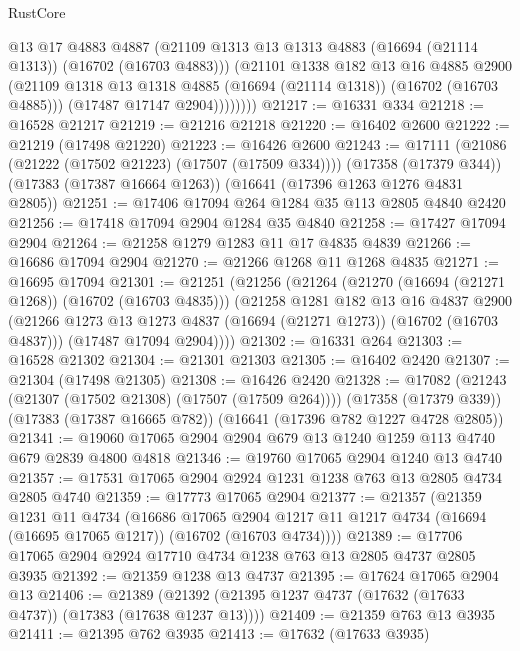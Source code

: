 \begin{lexlean}{RustCore}
\begin{coremodule}
                @13
                @17
                @4883
                @4887
                (@21109 @1313 @13 @1313 @4883 (@16694 (@21114 @1313)) (@16702 (@16703 @4883)))
                (@21101
                  @1338
                  @182
                  @13
                  @16
                  @4885
                  @2900
                  (@21109 @1318 @13 @1318 @4885 (@16694 (@21114 @1318)) (@16702 (@16703 @4885)))
                  (@17487 @17147 @2904))))))))
@21217 := @16331 @334
@21218 := @16528 @21217
@21219 := @21216 @21218
@21220 := @16402 @2600
@21222 := @21219 (@17498 @21220)
@21223 := @16426 @2600
@21243 := @17111
    (@21086 (@21222 (@17502 @21223) (@17507 (@17509 @334))))
    (@17358 (@17379 @344))
    (@17383 (@17387 @16664 @1263))
    (@16641 (@17396 @1263 @1276 @4831 @2805))
@21251 := @17406 @17094 @264 @1284 @35 @113 @2805 @4840 @2420
@21256 := @17418 @17094 @2904 @1284 @35 @4840
@21258 := @17427 @17094 @2904
@21264 := @21258 @1279 @1283 @11 @17 @4835 @4839
@21266 := @16686 @17094 @2904
@21270 := @21266 @1268 @11 @1268 @4835
@21271 := @16695 @17094
@21301 := @21251
    (@21256
      (@21264
        (@21270 (@16694 (@21271 @1268)) (@16702 (@16703 @4835)))
        (@21258
          @1281
          @182
          @13
          @16
          @4837
          @2900
          (@21266 @1273 @13 @1273 @4837 (@16694 (@21271 @1273)) (@16702 (@16703 @4837)))
          (@17487 @17094 @2904))))
@21302 := @16331 @264
@21303 := @16528 @21302
@21304 := @21301 @21303
@21305 := @16402 @2420
@21307 := @21304 (@17498 @21305)
@21308 := @16426 @2420
@21328 := @17082
    (@21243 (@21307 (@17502 @21308) (@17507 (@17509 @264))))
    (@17358 (@17379 @339))
    (@17383 (@17387 @16665 @782))
    (@16641 (@17396 @782 @1227 @4728 @2805))
@21341 := @19060 @17065 @2904 @2904 @679 @13 @1240 @1259 @113 @4740 @679 @2839 @4800 @4818
@21346 := @19760 @17065 @2904 @1240 @13 @4740
@21357 := @17531 @17065 @2904 @2924 @1231 @1238 @763 @13 @2805 @4734 @2805 @4740
@21359 := @17773 @17065 @2904
@21377 := @21357
    (@21359
      @1231
      @11
      @4734
      (@16686
        @17065
        @2904
        @1217
        @11
        @1217
        @4734
        (@16694 (@16695 @17065 @1217))
        (@16702 (@16703 @4734))))
@21389 := @17706 @17065 @2904 @2924 @17710 @4734 @1238 @763 @13 @2805 @4737 @2805 @3935
@21392 := @21359 @1238 @13 @4737
@21395 := @17624 @17065 @2904 @13
@21406 := @21389 (@21392 (@21395 @1237 @4737 (@17632 (@17633 @4737)) (@17383 (@17638 @1237 @13))))
@21409 := @21359 @763 @13 @3935
@21411 := @21395 @762 @3935
@21413 := @17632 (@17633 @3935)

\end{coremodule}
\end{lexlean}
